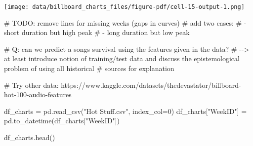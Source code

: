 \documentclass[
  a4paper,
]{scrbook}
\newenvironment{Shaded}{\begin{snugshade}}{\end{snugshade}}
\newcommand{\AlertTok}[1]{\textcolor[rgb]{0.68,0.00,0.00}{#1}}
\newcommand{\CommentTok}[1]{\textcolor[rgb]{0.37,0.37,0.37}{#1}}
\newcommand{\DecValTok}[1]{\textcolor[rgb]{0.68,0.00,0.00}{#1}}
\newcommand{\NormalTok}[1]{\textcolor[rgb]{0.00,0.23,0.31}{#1}}
\newcommand{\OperatorTok}[1]{\textcolor[rgb]{0.37,0.37,0.37}{#1}}
\newcommand{\StringTok}[1]{\textcolor[rgb]{0.13,0.47,0.30}{#1}}
\begin{document}
\texttt{[image: data/billboard\_charts\_files/figure-pdf/cell-15-output-1.png]}

\begin{Shaded}
\begin{Highlighting}[]
\CommentTok{\# }\AlertTok{TODO}\CommentTok{: remove lines for missing weeks (gaps in curves)}
\CommentTok{\# add two cases:}
\CommentTok{\#  {-} short duration but high peak}
\CommentTok{\#  {-} long duration but low peak}
\end{Highlighting}
\end{Shaded}

\begin{Shaded}
\begin{Highlighting}[]
\CommentTok{\# Q: can we predict a song\textquotesingle{}s survival using the features given in the data?}
\CommentTok{\# {-}{-}\textgreater{} at least introduce notion of training/test data and discuss the epistemological problem of using \textquotesingle{}all\textquotesingle{} historical }
\CommentTok{\# sources for explanation}
\end{Highlighting}
\end{Shaded}

\begin{Shaded}
\begin{Highlighting}[]
\CommentTok{\# Try other data: https://www.kaggle.com/datasets/thedevastator/billboard{-}hot{-}100{-}audio{-}features}
\end{Highlighting}
\end{Shaded}

\begin{Shaded}
\begin{Highlighting}[]
\NormalTok{df\_charts }\OperatorTok{=}\NormalTok{ pd.read\_csv(}\StringTok{"Hot Stuff.csv"}\NormalTok{, index\_col}\OperatorTok{=}\DecValTok{0}\NormalTok{)}
\NormalTok{df\_charts[}\StringTok{"WeekID"}\NormalTok{] }\OperatorTok{=}\NormalTok{ pd.to\_datetime(df\_charts[}\StringTok{"WeekID"}\NormalTok{])}
\end{Highlighting}
\end{Shaded}

\begin{Shaded}
\begin{Highlighting}[]
\NormalTok{df\_charts.head()}
\end{Highlighting}
\end{Shaded}
\end{document}
